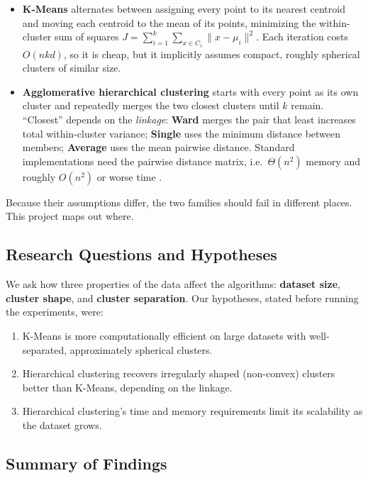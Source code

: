 \documentclass[11pt,letterpaper]{article}
\begin{document}
\begin{itemize}
    \item \textbf{K-Means} \cite{macqueen1967,lloyd1982} alternates between
    assigning every point to its nearest centroid and moving each centroid to
    the mean of its points, minimizing the within-cluster sum of squares
    $J=\sum_{i=1}^{k}\sum_{x\in C_i}\|x-\mu_i\|^2$. Each iteration costs
    $O(nkd)$, so it is cheap, but it implicitly assumes compact, roughly
    spherical clusters of similar size.
    \item \textbf{Agglomerative hierarchical clustering} starts with every
    point as its own cluster and repeatedly merges the two closest clusters
    until $k$ remain. ``Closest'' depends on the \emph{linkage}: \textbf{Ward}
    \cite{ward1963} merges the pair that least increases total within-cluster
    variance; \textbf{Single} \cite{sneath1957} uses the minimum distance
    between members; \textbf{Average} \cite{sokal1958} uses the mean pairwise
    distance. Standard implementations need the pairwise distance matrix, i.e.\
    $\Theta(n^2)$ memory and roughly $O(n^2)$ or worse time
    \cite{muellner2011}.
\end{itemize}

Because their assumptions differ, the two families should fail in different
places. This project maps out where.

\subsection{Research Questions and Hypotheses}

We ask how three properties of the data affect the algorithms:
\textbf{dataset size}, \textbf{cluster shape}, and \textbf{cluster
separation}. Our hypotheses, stated before running the experiments, were:

\begin{enumerate}[label=\textbf{H\arabic*.}]
    \item K-Means is more computationally efficient on large datasets with
    well-separated, approximately spherical clusters.
    \item Hierarchical clustering recovers irregularly shaped (non-convex)
    clusters better than K-Means, depending on the linkage.
    \item Hierarchical clustering's time and memory requirements limit its
    scalability as the dataset grows.
\end{enumerate}

\subsection{Summary of Findings}
\end{document}
